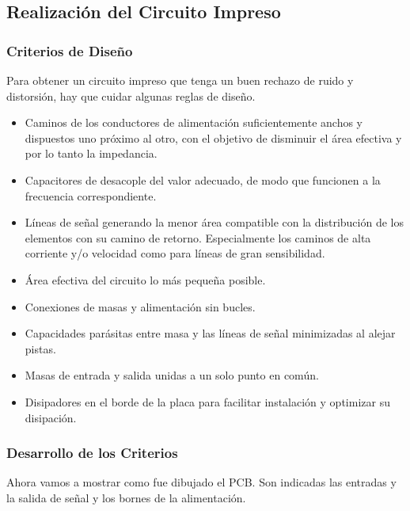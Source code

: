 \subsection{Realización del Circuito Impreso}
\bigskip 
\subsubsection{Criterios de Diseño}
Para obtener un circuito impreso que tenga un buen rechazo de ruido y distorsión, hay que cuidar algunas reglas de diseño.
\begin{itemize}
\bigskip 

\item  Caminos de los conductores de alimentación suficientemente anchos y  dispuestos uno próximo al otro, con el objetivo de disminuir el área efectiva y por lo tanto la impedancia.

\item Capacitores de desacople del valor adecuado, de modo que funcionen a la frecuencia correspondiente.

\item Líneas de señal generando la menor área compatible con la distribución de los elementos con su camino de retorno. Especialmente los caminos de alta corriente y/o velocidad como para líneas de gran sensibilidad.

\item Área efectiva del circuito lo más pequeña posible.

\item Conexiones de masas y alimentación sin bucles.

\item Capacidades parásitas entre masa y las líneas de señal minimizadas al alejar pistas.

\item Masas de entrada y salida unidas a un solo punto en común.

\item Disipadores en el borde de la placa para facilitar instalación y optimizar su disipación.

\end{itemize}
\subsubsection{Desarrollo de los Criterios}

Ahora vamos a mostrar como fue dibujado el PCB. Son indicadas las entradas y la salida de señal y los bornes de la alimentación. %

